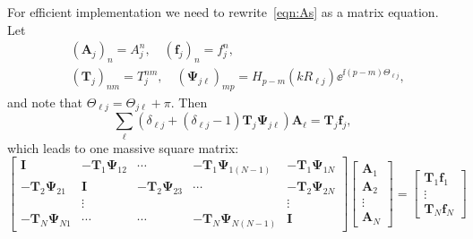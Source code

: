 \documentclass[ 12pt, a4paper]{article}
\renewcommand{\vec}[1]{\boldsymbol{#1}}
\begin{document}
For efficient implementation we need to rewrite~\eqref{eqn:As} as a matrix equation. Let
\begin{align}
  &(\vec A_j)_n =  A_j^n, \quad (\vec f_j)_n =  f_j^n,
  \\
  &(\vec T_j)_{nm} = T^{nm}_j, \quad (\vec \Psi_{j \ell})_{mp} =  H_{p-m}(k R_{\ell j})\ee^{\ii(p-m)\Theta_{\ell j}},
\end{align}
and note that $\Theta_{\ell j} = \Theta_{j \ell } + \pi$. Then
\begin{equation}
 \sum_{\ell}(\delta_{\ell j} +  (\delta_{\ell j}-1) \vec T_j \vec \Psi_{j \ell}) \vec A_\ell  = \vec T_j \vec f_j,
\end{equation}
which leads to one massive square matrix:
\begin{equation}
  \begin{bmatrix}
    \vec I & -\vec T_1 \vec \Psi_{1 2} & \cdots & -\vec T_1 \vec \Psi_{1 (N-1)} & -\vec T_1 \vec \Psi_{1 N} \\
    -\vec T_2 \vec \Psi_{2 1} & \vec I &  -\vec T_2 \vec \Psi_{2 3} & \cdots & -\vec T_2 \vec \Psi_{2 N} \\
     & \vdots & & & \vdots \\
     -\vec T_N \vec \Psi_{N 1}  & \cdots & \cdots & - \vec T_N \vec \Psi_{N (N-1)} & \vec I
  \end{bmatrix}
  \begin{bmatrix}
    \vec A_1 \\
    \vec A_2 \\
    \vdots \\
    \vec A_N
  \end{bmatrix}
   = \begin{bmatrix}
     \vec T_1 \vec f_1 \\
     \vdots \\
     \vec T_N \vec f_N
   \end{bmatrix}
\end{equation}


\printbibliography
\end{document}
